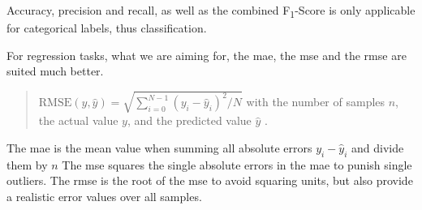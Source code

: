 Accuracy, precision and recall, as well as the combined F\textsubscript{1}-Score is only applicable for categorical labels, thus classification.

For regression tasks, what we are aiming for, the \gls{mae}, the \gls{mse} and the \gls{rmse} are suited much better.

\begin{quote}
\begin{math}
\text{RMSE}(y, \hat{y}) = \sqrt{\sum_{i=0}^{N - 1} (y_i - \hat{y}_i)^2 / N }
\end{math}\newline
with the number of samples $n$, the actual value $y$, and the predicted value $\hat{y}$ \cite{MAE_RMSE}.
\end{quote}

The \gls{mae} is the mean value when summing all absolute errors $y_i - \hat{y}_i$ and divide them by $n$
The \gls{mse} squares the single absolute errors in the \gls{mae} to punish single outliers.
The \gls{rmse} is the root of the \gls{mse} to avoid squaring units, but also provide a realistic error values over all samples.

